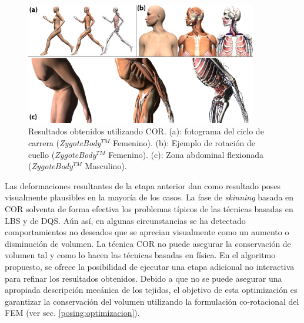 \begin{figure}%
   \centering
   \includegraphics[width=0.90\textwidth]{IMG/examples}
    \caption{Resultados obtenidos utilizando \acs{COR}. (a): fotograma del ciclo de carrera (\emph{ZygoteBody}$^{TM}$ Femenino). (b): Ejemplo de rotación de cuello (\emph{ZygoteBody}$^{TM}$ Femenino). (c): Zona abdominal flexionada (\emph{ZygoteBody}$^{TM}$ Masculino).}
    \label{fig:run1}
\end{figure}
\clearpage


Las deformaciones resultantes de la etapa anterior dan como resultado poses visualmente plausibles en la mayoría de los casos. 
La fase de \emph{skinning} basada en \ac{COR} solventa de forma efectiva los problemas típicos de las técnicas basadas en \ac{LBS} y de \ac{DQS}. Aún así, en algunas circunstancias se ha detectado comportamientos no deseados que se aprecian visualmente como un aumento o disminución de volumen. 
La técnica \ac{COR} no puede asegurar la conservación de volumen tal y como lo hacen las técnicas basadas en física. %
En el algoritmo propuesto, se ofrece la posibilidad de ejecutar una etapa adicional no interactiva para refinar los resultados obtenidos.
Debido a que no se puede asegurar una apropiada descripción mecánica de los tejidos, el objetivo de esta optimización es garantizar la conservación del volumen utilizando la formulación co-rotacional del \acs{FEM} (ver sec. \ref{posing:optimizacion}).

